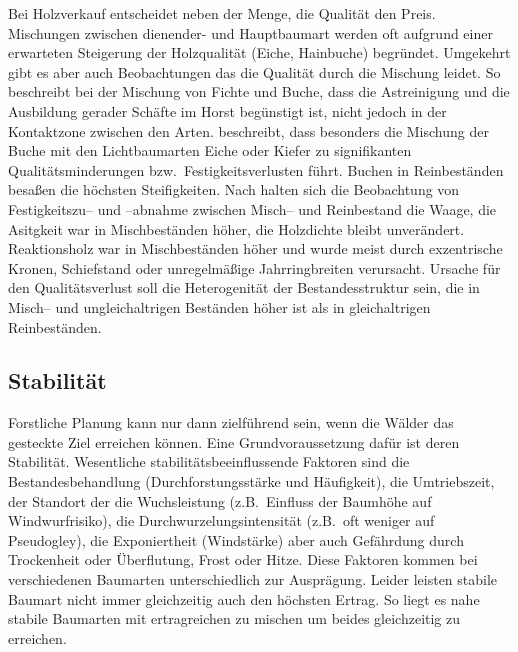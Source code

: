 \documentclass[twocolumn]{scrartcl}
\begin{document}
Bei Holzverkauf entscheidet neben der Menge, die Qualität den
Preis. Mischungen zwischen dienender- und Hauptbaumart werden oft
aufgrund einer erwarteten Steigerung der Holzqualität (Eiche,
Hainbuche) begründet. Umgekehrt gibt es aber auch Beobachtungen das
die Qualität durch die Mischung leidet. So beschreibt
\cite{tiebel2016qualitaet} bei der Mischung von Fichte und Buche, dass
die Astreinigung und die Ausbildung gerader Schäfte im Horst
begünstigt ist, nicht jedoch in der Kontaktzone zwischen den
Arten. \cite{rais2019MischungQualitaet} beschreibt, dass besonders die
Mischung der Buche mit den Lichtbaumarten Eiche oder Kiefer zu
signifikanten Qualitätsminderungen bzw.\ Festigkeitsverlusten
führt. Buchen in Reinbeständen besaßen die höchsten
Steifigkeiten. Nach \cite{pretzsch2016holzqualitaetMischRein} halten
sich die Beobachtung von Festigkeitszu-- und --abnahme zwischen
Misch-- und Reinbestand die Waage, die Asitgkeit war in Mischbeständen
höher, die Holzdichte bleibt unverändert. Reaktionsholz war in
Mischbeständen höher und wurde meist durch exzentrische Kronen,
Schiefstand oder unregelmäßige Jahrringbreiten verursacht. Ursache für
den Qualitätsverlust soll die Heterogenität der Bestandesstruktur sein,
die in Misch-- und ungleichaltrigen Beständen höher ist als in
gleichaltrigen Reinbeständen.

\subsection{Stabilität}
\label{ssec:stabilitaet}

Forstliche Planung kann nur dann zielführend sein, wenn die Wälder das
gesteckte Ziel erreichen können. Eine Grundvoraussetzung dafür ist
deren Stabilität. Wesentliche stabilitätsbeeinflussende Faktoren sind
die Bestandesbehandlung (Durchforstungsstärke und Häufigkeit), die
Umtriebszeit, der Standort der die Wuchsleistung (z.B.\ Einfluss der
Baumhöhe auf Windwurfrisiko), die Durchwurzelungsintensität (z.B.\ oft
weniger auf Pseudogley), die Exponiertheit (Windstärke) aber auch
Gefährdung durch Trockenheit oder Überflutung, Frost oder Hitze. Diese
Faktoren kommen bei verschiedenen Baumarten unterschiedlich zur
Ausprägung. Leider leisten stabile Baumart nicht immer gleichzeitig
auch den höchsten Ertrag. So liegt es nahe stabile Baumarten mit
ertragreichen zu mischen um beides gleichzeitig zu erreichen.
\end{document}
